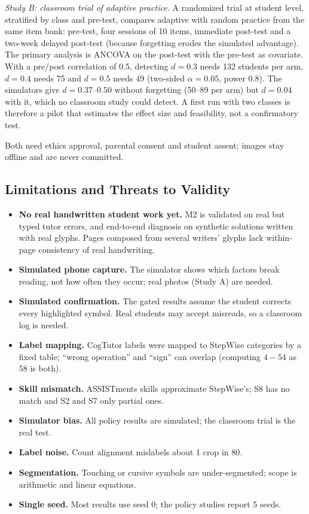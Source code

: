 \documentclass[conference]{IEEEtran}
\begin{document}
\textit{Study B: classroom trial of adaptive practice.} A randomized trial at student level, stratified by class and pre-test, compares adaptive with random practice from the same item bank: pre-test, four sessions of 10 items, immediate post-test and a two-week delayed post-test (because forgetting erodes the simulated advantage). The primary analysis is ANCOVA on the post-test with the pre-test as covariate. With a pre/post correlation of 0.5, detecting $d=0.3$ needs 132 students per arm, $d=0.4$ needs 75 and $d=0.5$ needs 49 (two-sided $\alpha=0.05$, power 0.8). The simulators give $d=0.37$--$0.50$ without forgetting (50--89 per arm) but $d=0.04$ with it, which no classroom study could detect. A first run with two classes is therefore a pilot that estimates the effect size and feasibility, not a confirmatory test.

Both need ethics approval, parental consent and student assent; images stay offline and are never committed.

\subsection{Limitations and Threats to Validity}
\begin{itemize}
\item \textbf{No real handwritten student work yet.} M2 is validated on real but typed tutor errors, and end-to-end diagnosis on synthetic solutions written with real glyphs. Pages composed from several writers' glyphs lack within-page consistency of real handwriting.
\item \textbf{Simulated phone capture.} The simulator shows which factors break reading, not how often they occur; real photos (Study A) are needed.
\item \textbf{Simulated confirmation.} The gated results assume the student corrects every highlighted symbol. Real students may accept misreads, so a classroom log is needed.
\item \textbf{Label mapping.} CogTutor labels were mapped to StepWise categories by a fixed table; ``wrong operation'' and ``sign'' can overlap (computing $4 - 54$ as $58$ is both).
\item \textbf{Skill mismatch.} ASSISTments skills approximate StepWise's; S8 has no match and S2 and S7 only partial ones.
\item \textbf{Simulator bias.} All policy results are simulated; the classroom trial is the real test.
\item \textbf{Label noise.} Count alignment mislabels about 1 crop in 80.
\item \textbf{Segmentation.} Touching or cursive symbols are under-segmented; scope is arithmetic and linear equations.
\item \textbf{Single seed.} Most results use seed 0; the policy studies report 5 seeds.
\end{itemize}
\end{document}
